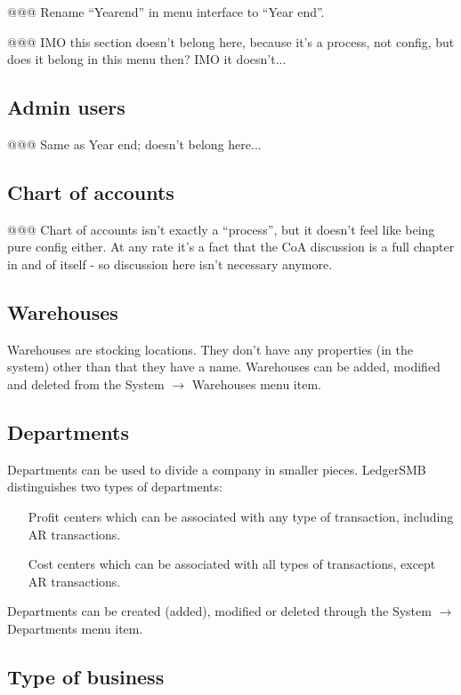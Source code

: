 @@@ Rename ``Yearend'' in menu interface to ``Year end''.


@@@ IMO this section doesn't belong here, because it's a process, not config, but does it belong in this menu then? IMO it doesn't...


\subsection{Admin users}

@@@ Same as Year end; doesn't belong here...

\subsection{Chart of accounts}

@@@ Chart of accounts isn't exactly a ``process'', but it doesn't feel like being pure
config either. At any rate it's a fact that the CoA discussion is a full chapter in and
of itself - so discussion here isn't necessary anymore.

\subsection{Warehouses}

Warehouses are stocking locations. They don't have any properties (in the system)
other than that they have a name. Warehouses can be added, modified and deleted from
the System $\rightarrow$ Warehouses menu item.

\subsection{Departments}

Departments can be used to divide a company in smaller pieces. LedgerSMB distinguishes two
types of departments:

\begin{itemize}
\item [Profit centers] which can be associated with any type of transaction, including AR transactions.
\item [Cost centers] which can be associated with all types of transactions, except AR transactions.
\end{itemize}

Departments can be created (added), modified or deleted through the System $\rightarrow$ Departments menu item.

\subsection{Type of business}

